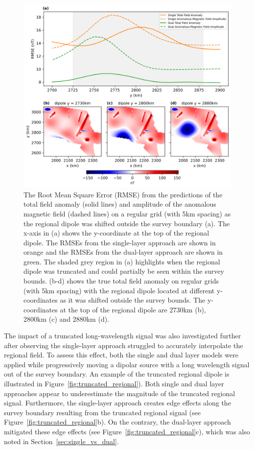 \begin{figure}[tb!]
\centering
\includegraphics[width=1\linewidth]{paper/figures/truncated_regional_rmses.png}
\caption{
    The Root Mean Square Error (RMSE) from the predictions of the total field anomaly (solid lines) and amplitude of the anomalous magnetic field (dashed lines) on a regular grid (with 5km spacing) as the regional dipole was shifted outside the survey boundary (a). The x-axis in (a) shows the y-coordinate at the top of the regional dipole. The RMSEs from the single-layer approach are shown in orange and the RMSEs from the dual-layer approach are shown in green. The shaded grey region in (a) highlights when the regional dipole was truncated and could partially be seen within the survey bounds. (b-d) shows the true total field anomaly on regular grids (with 5km spacing) with the regional dipole located at different y-coordinates as it was shifted outside the survey bounds. The y-coordinates at the top of the regional dipole are 2730km (b), 2800km (c) and 2880km (d).
}
\label{fig:truncated_regional_rmses}
\end{figure}

The impact of a truncated long-wavelength signal was also investigated further after observing the single-layer approach struggled to accurately interpolate the regional field. To assess this effect, both the single and dual layer models were applied while progressively moving a dipolar source with a long wavelength signal out of the survey boundary. An example of the truncated regional dipole is illustrated in Figure~\ref{fig:truncated_regional}). Both single and dual layer approaches appear to underestimate the magnitude of the truncated regional signal. Furthermore, the single-layer approach creates edge effects along the survey boundary resulting from the truncated regional signal (see Figure~\ref{fig:truncated_regional}b). On the contrary, the dual-layer approach mitigated these edge effects (see Figure~\ref{fig:truncated_regional}c), which was also noted in Section~\ref{sec:single_vs_dual}.

